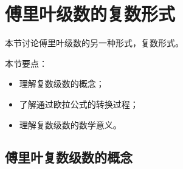 \section{傅里叶级数的复数形式}

本节讨论傅里叶级数的另一种形式，复数形式。

本节要点：
\begin{itemize}
    \item 理解复数级数的概念；
    \item 了解通过欧拉公式的转换过程；
    \item 理解复数级数的数学意义。
\end{itemize}

\subsection{傅里叶复数级数的概念}

